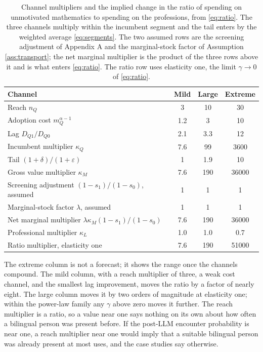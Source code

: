 \documentclass[11pt]{article}
\theoremstyle{definition}
\theoremstyle{remark}
\begin{document}
\begin{table}[tbp]
\centering
\begin{tabular}{lccc}
\toprule
Channel & Mild & Large & Extreme \\
\midrule
Reach $n_Q$ & 3 & 10 & 30 \\
Adoption cost $m_Q^{\alpha-1}$ & 1.2 & 3 & 10 \\
Lag $D_{Q1}/D_{Q0}$ & 2.1 & 3.3 & 12 \\
\midrule
Incumbent multiplier $\kappa_Q$ & 7.6 & 99 & 3600 \\
Tail $(1+\delta)/(1+\varepsilon)$ & 1 & 1.9 & 10 \\
\midrule
Gross value multiplier $\kappa_M$ & 7.6 & 190 & 36000 \\
Screening adjustment $(1-s_1)/(1-s_0)$, assumed & 1 & 1 & 1 \\
Marginal-stock factor $\lambda$, assumed & 1 & 1 & 1 \\
Net marginal multiplier $\lambda\kappa_M(1-s_1)/(1-s_0)$ & 7.6 & 190 & 36000 \\
Professional multiplier $\kappa_L$ & 1.0 & 1.0 & 0.7 \\
\midrule
Ratio multiplier, elasticity one & 7.6 & 190 & 51000 \\
\bottomrule
\end{tabular}
\caption{Channel multipliers and the implied change in the ratio of spending on unmotivated mathematics to spending on the professions, from \eqref{eq:ratio}. The three channels multiply within the incumbent segment and the tail enters by the weighted average \eqref{eq:segments}. The two assumed rows are the screening adjustment of Appendix A and the marginal-stock factor of Assumption \ref{ass:transport}; the net marginal multiplier is the product of the three rows above it and is what enters \eqref{eq:ratio}. The ratio row uses elasticity one, the limit $\gamma \to 0$ of \eqref{eq:ratio}.}
\label{tab:channels}
\end{table}

The extreme column is not a forecast; it shows the range once the channels compound. The mild column, with a reach multiplier of three, a weak cost channel, and the smallest lag improvement, moves the ratio by a factor of nearly eight. The large column moves it by two orders of magnitude at elasticity one; within the power-law family any $\gamma$ above zero moves it further. The reach multiplier is a ratio, so a value near one says nothing on its own about how often a bilingual person was present before. If the post-LLM encounter probability is near one, a reach multiplier near one would imply that a suitable bilingual person was already present at most uses, and the case studies say otherwise.
\end{document}
